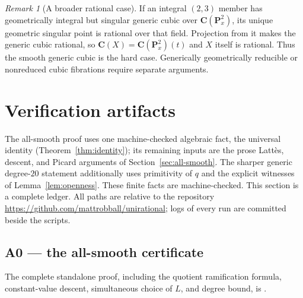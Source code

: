 \documentclass[11pt]{amsart}
\theoremstyle{definition}
\theoremstyle{remark}
\newtheorem{remark}[theorem]{Remark}
\newcommand{\PP}{\mathbf{P}}
\newcommand{\CC}{\mathbf{C}}
\newcommand{\repo}{\url{https://github.com/mattrobball/unirational}}
\begin{document}
\begin{remark}[A broader rational case]
If an integral $(2,3)$ member has geometrically integral but singular
generic cubic over $\CC(\PP^2_x)$, its unique geometric singular point is
rational over that field.  Projection from it makes the generic cubic
rational, so $\CC(X)=\CC(\PP^2_x)(t)$ and $X$ itself is rational.  Thus the
smooth generic cubic is the hard case.  Generically geometrically reducible
or nonreduced cubic fibrations require separate arguments.
\end{remark}

\section{Verification artifacts}\label{sec:artifacts}

The all-smooth proof uses one machine-checked algebraic fact, the universal
identity (Theorem~\ref{thm:identity}); its remaining inputs are the prose
Latt\`es, descent, and Picard arguments of Section~\ref{sec:all-smooth}.
The sharper generic degree-$20$ statement additionally uses primitivity of
$q$ and the explicit witnesses of Lemma~\ref{lem:openness}.  These finite
facts are machine-checked.
This section is a complete ledger.  All paths are relative to the
repository \repo; logs of every run are committed beside the scripts.

\subsection*{A0 --- the all-smooth certificate}
The complete standalone proof, including the quotient ramification formula,
constant-value descent, simultaneous choice of $L$, and degree bound, is
.
\end{document}
